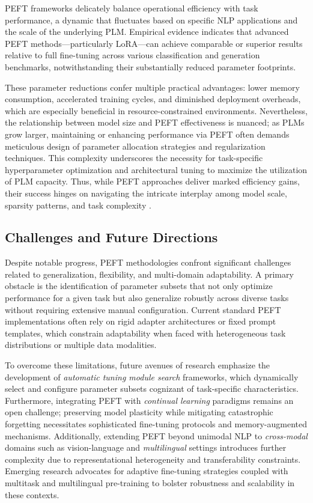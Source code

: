 \documentclass[sigconf]{acmart}
\begin{document}
PEFT frameworks delicately balance operational efficiency with task performance, a dynamic that fluctuates based on specific NLP applications and the scale of the underlying PLM. Empirical evidence indicates that advanced PEFT methods—particularly LoRA—can achieve comparable or superior results relative to full fine-tuning across various classification and generation benchmarks, notwithstanding their substantially reduced parameter footprints. 

These parameter reductions confer multiple practical advantages: lower memory consumption, accelerated training cycles, and diminished deployment overheads, which are especially beneficial in resource-constrained environments. Nevertheless, the relationship between model size and PEFT effectiveness is nuanced; as PLMs grow larger, maintaining or enhancing performance via PEFT often demands meticulous design of parameter allocation strategies and regularization techniques. This complexity underscores the necessity for task-specific hyperparameter optimization and architectural tuning to maximize the utilization of PLM capacity. Thus, while PEFT approaches deliver marked efficiency gains, their success hinges on navigating the intricate interplay among model scale, sparsity patterns, and task complexity \cite{ref48}.

\subsection{Challenges and Future Directions}

Despite notable progress, PEFT methodologies confront significant challenges related to generalization, flexibility, and multi-domain adaptability. A primary obstacle is the identification of parameter subsets that not only optimize performance for a given task but also generalize robustly across diverse tasks without requiring extensive manual configuration. Current standard PEFT implementations often rely on rigid adapter architectures or fixed prompt templates, which constrain adaptability when faced with heterogeneous task distributions or multiple data modalities.

To overcome these limitations, future avenues of research emphasize the development of \textit{automatic tuning module search} frameworks, which dynamically select and configure parameter subsets cognizant of task-specific characteristics. Furthermore, integrating PEFT with \textit{continual learning} paradigms remains an open challenge; preserving model plasticity while mitigating catastrophic forgetting necessitates sophisticated fine-tuning protocols and memory-augmented mechanisms. Additionally, extending PEFT beyond unimodal NLP to \textit{cross-modal} domains such as vision-language and \textit{multilingual} settings introduces further complexity due to representational heterogeneity and transferability constraints. Emerging research advocates for adaptive fine-tuning strategies coupled with multitask and multilingual pre-training to bolster robustness and scalability in these contexts.
\end{document}
